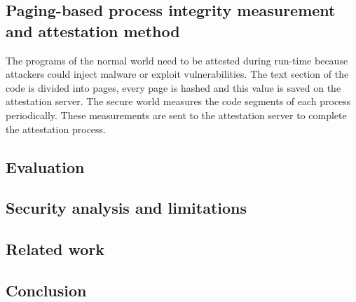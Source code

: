 \documentclass{article}
\begin{document}
\subsection{Paging-based process integrity measurement and attestation method}

The programs of the normal world need to be attested during run-time because attackers could inject malware or exploit vulnerabilities. The text section of the code is divided into pages, every page is hashed and this value is saved on the attestation server. The secure world measures the code segments of each process periodically. These measurements are sent to the attestation server to complete the attestation process. 

\subsection{Evaluation}

\subsection{Security analysis and limitations}

\subsection{Related work}

\subsection{Conclusion}
\end{document}
